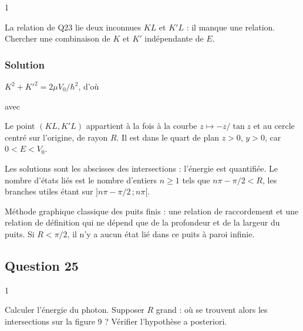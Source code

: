 \documentclass[11pt,a4paper]{article}
\newcommand{\equationajustee}[1]{%
  \sbox{\boiteequation}{$\displaystyle #1$}%
  \ifdim\wd\boiteequation>\linewidth
    \[\resizebox{\linewidth}{!}{\usebox{\boiteequation}}\]%
  \else
    \[#1\]%
  \fi}
\begin{document}
\begin{indication}{1}

La relation de Q23 lie deux inconnues \(KL\) et \(K'L\) : il manque une relation. Chercher une combinaison de \(K\) et \(K'\) indépendante de \(E\).

\end{indication}

\hypertarget{solution-23}{%
\subsubsection{Solution}\label{solution-23}}

\(K^2 + K'^2 = 2\mu V_0/\hbar^2\), d'où

\equationajustee{(KL)^2 + (K'L)^2 = R^2,}

avec

\equationajustee{\boxed{R = \frac{L\sqrt{2\mu V_0}}{\hbar}}}

Le point \((KL, K'L)\) appartient à la fois à la courbe \(z\mapsto-z/\tan z\) et au cercle centré sur l'origine, de rayon \(R\). Il est dans le quart de plan \(z>0\), \(y>0\), car \(0<E<V_0\).

Les solutions sont les abscisses des intersections : l'énergie est quantifiée. Le nombre d'états liés est le nombre d'entiers \(n\ge1\) tels que \(n\pi-\pi/2<R\), les branches utiles étant sur \(]n\pi-\pi/2\,;n\pi[\).

\begin{methode}

Méthode graphique classique des puits finis : une relation de raccordement et une relation de définition qui ne dépend que de la profondeur et de la largeur du puits. Si \(R<\pi/2\), il n'y a aucun état lié dans ce puits à paroi infinie.

\end{methode}

\hypertarget{question-25}{%
\subsection{Question 25}\label{question-25}}

\begin{indication}{1}

Calculer l'énergie du photon. Supposer \(R\) grand : où se trouvent alors les intersections sur la figure 9 ? Vérifier l'hypothèse a posteriori.

\end{indication}
\end{document}
